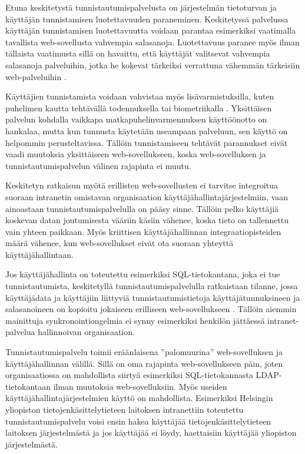 Etuna keskitetystä tunnistautumispalvelusta on järjestelmän tietoturvan ja käyttäjän tunnistamisen luotettavuuden paraneminen. Keskitetyssä palvelussa käyttäjän tunnistamisen luotettavuutta voidaan parantaa esimerkiksi vaatimalla tavallista web-sovellusta vahvempia salasanoja. Luotettavuus paranee myös ilman tällaista vaatimusta sillä on havaittu, että käyttäjät valitsevat vahvempia salasanoja palveluihin, jotka he kokevat tärkeiksi verrattuna vähemmän tärkeisiin web-palveluihin \cite{password_habits}.

Käyttäjien tunnistamista voidaan vahvistaa myös lisävarmistuksilla, kuten puhelimen kautta tehtävällä todennuksella tai biometriikalla \cite{nisti}. Yksittäisen palvelun kohdalla vaikkapa matkapuhelinvarmennuksen käyttöönotto on hankalaa, mutta kun tunnusta käytetään useampaan palveluun, sen käyttö on helpommin perusteltavissa. Tällöin tunnistamiseen tehtävät parannukset eivät vaadi muutoksia yksittäiseen web-sovellukseen, koska web-sovelluksen ja tunnistautumispalvelun välinen rajapinta ei muutu.

Keskitetyn ratkaisun myötä erillisten web-sovellusten ei tarvitse integroitua suoraan intranetin omistavan organisaation käyttäjähallintajärjestelmiin, vaan ainoastaan tunnistautumispalvelulla on pääsy sinne. Tällöin pelko käyttäjiä koskevan datan joutumisesta vääriin käsiin vähenee, koska tieto on tallennettu vain yhteen paikkaan. Myös kriittisen käyttäjähallinnan integraatiopisteiden määrä vähenee, kun web-sovellukset eivät ota suoraan yhteyttä käyttäjähallintaan.

Jos käyttäjähallinta on toteutettu esimerkiksi SQL-tietokantana, joka ei tue tunnistautumista, keskitetyllä tunnistautumispalvelulla ratkaistaan tilanne, jossa käyttäjädata ja käyttäjiin liittyviä tunnistautumistietoja käyttäjätunnuksineen ja salasanoineen on kopioitu jokaiseen erilliseen web-sovellukseen \cite{billion_keys}. Tällöin aiemmin mainittuja synkronointiongelmia ei synny esimerkiksi henkilön jättäessä intranet-palvelua hallinnoivan organisaation.

Tunnistautumispalvelu toimii eräänlaisena ''palomuurina'' web-sovelluksen ja käyttäjähallinnan välillä. Sillä on oma rajapinta web-sovellukseen päin, joten organisaatiossa on mahdollista siirtyä esimerkiksi SQL-tietokannasta LDAP-tietokantaan ilman muutoksia web-sovelluksiin. Myös useiden käyttäjähallintajärjestelmien käyttö on mahdollista. Esimerkiksi Helsingin yliopiston tietojenkäsittelytieteen laitoksen intranettiin toteutettu tunnistautumispalvelu voisi ensin hakea käyttäjää tietojenkäsittelytieteen laitoksen järjestelmästä ja jos käyttäjää ei löydy, haettaisiin käyttäjää yliopiston järjestelmästä.

